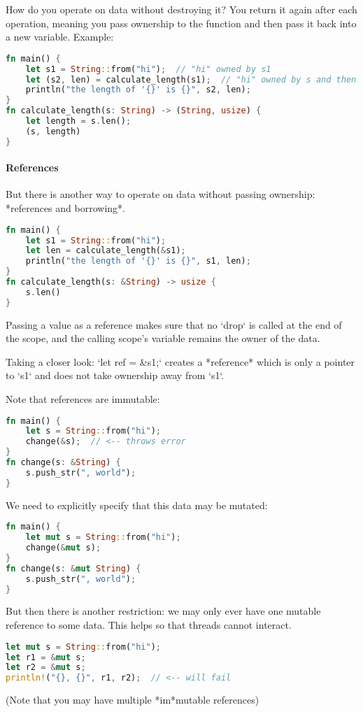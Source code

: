 How do you operate on data without destroying it?
You return it again after each operation, meaning you pass ownership to the function and then pass it back into a new variable.
Example: 

\begin{lstlisting}[language=rust]
fn main() {
    let s1 = String::from("hi");  // "hi" owned by s1
    let (s2, len) = calculate_length(s1);  // "hi" owned by s and then s2
    println("the length of '{}' is {}", s2, len);
}
fn calculate_length(s: String) -> (String, usize) {
    let length = s.len();
    (s, length)
}
\end{lstlisting}

\paragraph{References}
But there is another way to operate on data without passing ownership: *references and borrowing*.
\begin{lstlisting}[language=rust]
fn main() {
    let s1 = String::from("hi");
    let len = calculate_length(&s1);
    println("the length of '{}' is {}", s1, len);
}
fn calculate_length(s: &String) -> usize {
    s.len()
}
\end{lstlisting}
Passing a value as a reference makes sure that no `drop` is called at the end of the scope, and the calling scope's variable remains the owner of the data.

Taking a closer look:
`let ref = &s1;` creates a *reference* which is only a pointer to `s1` and does not take ownership away from `s1`.

Note that references are immutable: 
\begin{lstlisting}[language=rust]
fn main() {
    let s = String::from("hi");
    change(&s);  // <-- throws error
}
fn change(s: &String) {
    s.push_str(", world");
}
\end{lstlisting}
We need to explicitly specify that this data may be mutated:
\begin{lstlisting}[language=rust]
fn main() {
    let mut s = String::from("hi");
    change(&mut s);
}
fn change(s: &mut String) {
    s.push_str(", world");
}
\end{lstlisting}
But then there is another restriction: we may only ever have one mutable reference to some data. This helps so that threads cannot interact.
\begin{lstlisting}[language=rust]
let mut s = String::from("hi");
let r1 = &mut s;
let r2 = &mut s;
println!("{}, {}", r1, r2);  // <-- will fail
\end{lstlisting}
(Note that you may have multiple *im*mutable references)

